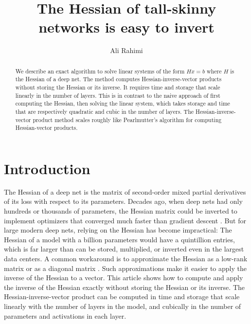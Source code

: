 \documentclass{article}
\title{The Hessian of tall-skinny networks is easy to invert}
\author{Ali Rahimi}
\begin{document}
\maketitle \begin{abstract} We describe an exact algorithm to solve linear
  systems of the form $Hx=b$ where $H$ is the Hessian of a deep net. The method
  computes Hessian-inverse-vector products without storing the Hessian or its
  inverse. It requires time and storage that scale linearly in the number of
  layers.  This is in contrast to the naive approach of first computing the
  Hessian, then solving the linear system, which takes storage and time that are
  respectively quadratic and cubic in the number of layers.  The
  Hessian-inverse-vector product method scales roughly like Pearlmutter's
  algorithm for computing Hessian-vector products.
\end{abstract}

\section{Introduction}

The Hessian of a deep net is the matrix of second-order mixed partial
derivatives of its loss with respect to its parameters. Decades ago, when deep
nets had only hundreds or thousands of parameters, the Hessian matrix could be
inverted to implement optimizers that converged much faster than gradient
descent \cite{Watrous1987, Barnard1992}.  But for large modern deep nets, relying on the
Hessian has become impractical: The Hessian of a model with a billion
parameters would have a quintillion entries, which is far larger than can be
stored, multiplied, or inverted even in the largest data centers. A
common workaround is to approximate the Hessian as a low-rank matrix
\cite{Webb1988, lbfgs-deep-net} or as a diagonal matrix \cite{becker-lecun-89,
  adagrad, adam}. Such approximations make it easier to apply the inverse of the
Hessian to a vector. This article shows how to compute and apply the inverse of
the Hessian exactly without storing the Hessian or its inverse.
The Hessian-inverse-vector product can be computed in time and storage that
scale linearly with the number of layers in the model, and cubically in the
number of parameters and activations in each layer.
\end{document}

